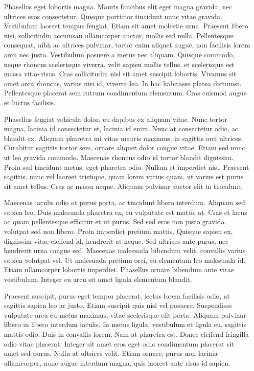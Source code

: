 \documentclass{modelica}
\begin{document}
Phasellus eget lobortis magna. Mauris faucibus elit eget magna gravida, nec ultrices eros consectetur. Quisque porttitor tincidunt nunc vitae gravida. Vestibulum laoreet tempus feugiat. Etiam sit amet molestie urna. Praesent libero nisi, sollicitudin accumsan ullamcorper auctor, mollis sed nulla. Pellentesque consequat, nibh ac ultrices pulvinar, tortor enim aliquet augue, non facilisis lorem arcu nec justo. Vestibulum posuere a metus nec aliquam. Quisque commodo, neque rhoncus scelerisque viverra, velit sapien mollis tellus, et scelerisque est massa vitae risus. Cras sollicitudin nisl sit amet suscipit lobortis. Vivamus sit amet arcu rhoncus, varius nisi id, viverra leo. In hac habitasse platea dictumst. Pellentesque placerat sem rutrum condimentum elementum. Cras euismod augue et luctus facilisis.

Phasellus feugiat vehicula dolor, eu dapibus ex aliquam vitae. Nunc tortor magna, lacinia id consectetur et, lacinia id enim. Nunc at consectetur odio, ac blandit ex. Aliquam pharetra mi vitae mauris maximus, in sagittis orci ultrices. Curabitur sagittis tortor sem, ornare aliquet dolor congue vitae. Etiam sed nunc ut leo gravida commodo. Maecenas rhoncus odio id tortor blandit dignissim. Proin sed tincidunt metus, eget pharetra odio. Nullam et imperdiet nisl. Praesent sagittis, nunc vel laoreet tristique, quam lorem varius quam, ut varius est purus sit amet tellus. Cras ac massa neque. Aliquam pulvinar auctor elit in tincidunt.

Maecenas iaculis odio at purus porta, ac tincidunt libero interdum. Aliquam sed sapien leo. Duis malesuada pharetra ex, eu vulputate est mattis at. Cras et lacus ac quam pellentesque efficitur et ut purus. Sed sed eros non justo gravida volutpat sed non libero. Proin imperdiet pretium mattis. Quisque sapien ex, dignissim vitae eleifend id, hendrerit at neque. Sed ultrices ante purus, nec hendrerit urna congue sed. Maecenas malesuada bibendum velit, convallis varius sapien volutpat vel. Ut malesuada pretium orci, eu elementum leo malesuada id. Etiam ullamcorper lobortis imperdiet. Phasellus ornare bibendum ante vitae vestibulum. Integer eu arcu sit amet ligula elementum blandit.

Praesent suscipit, purus eget tempor placerat, lectus lorem facilisis odio, at sagittis sapien leo ac justo. Etiam suscipit quis nisl vel posuere. Suspendisse vulputate arcu eu metus maximus, vitae scelerisque elit porta. Aliquam pulvinar libero in libero interdum iaculis. In metus ligula, vestibulum et ligula eu, sagittis mattis odio. Duis in convallis lorem. Nam at pharetra est. Donec eleifend fringilla odio vitae placerat. Integer sit amet eros eget odio condimentum placerat sit amet sed purus. Nulla at ultrices velit. Etiam ornare, purus non lacinia ullamcorper, nunc augue interdum magna, quis laoreet ante risus id sapien.
\end{document}
